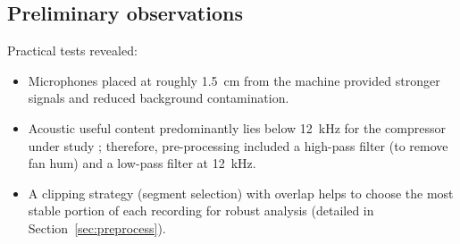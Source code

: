 \documentclass[12pt,a4paper]{article}
\begin{document}
\subsection{Preliminary observations}
Practical tests revealed:
\begin{itemize}
    \item Microphones placed at roughly \SI{1.5}{cm} from the machine provided stronger signals and reduced background contamination.
    \item Acoustic useful content predominantly lies below \SI{12}{kHz} for the compressor under study \cite{Verma2016}; therefore, pre-processing included a high-pass filter (to remove fan hum) and a low-pass filter at \SI{12}{kHz}.
    \item A clipping strategy (segment selection) with overlap helps to choose the most stable portion of each recording for robust analysis (detailed in Section~\ref{sec:preprocess}).
\end{itemize}


\end{document}
